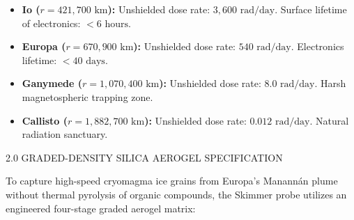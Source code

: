 \documentclass[12pt,twoside,openright]{book}
\newcommand{\sceneheader}[1]{%
  \par\vspace{1.8em}%
  {\noindent\centering\scshape\large #1\par}%
  \vspace{1.0em}%
  \noindent%
}
\newcommand{\dinkus}{%
  \par\vspace{1.2em}%
  {\noindent\centering{\large $\ast\quad\ast\quad\ast$}\par}%
  \vspace{1.2em}%
  \noindent%
}
\providecommand{\tightlist}{\setlength{\itemsep}{0pt}\setlength{\parskip}{0pt}
\setlength{\tabcolsep}{2pt}}
\begin{document}
\begin{itemize}
\tightlist
\item
  \textbf{Io (\(r = 421,700\text{ km}\)):} Unshielded dose rate:
  \textbf{\(3,600 \text{ rad/day}\)}. Surface lifetime of electronics:
  \(< 6\text{ hours}\).
\item
  \textbf{Europa (\(r = 670,900\text{ km}\)):} Unshielded dose rate:
  \textbf{\(540 \text{ rad/day}\)}. Electronics lifetime:
  \(< 40\text{ days}\).
\item
  \textbf{Ganymede (\(r = 1,070,400\text{ km}\)):} Unshielded dose rate:
  \textbf{\(8.0 \text{ rad/day}\)}. Harsh magnetospheric trapping zone.
\item
  \textbf{Callisto (\(r = 1,882,700\text{ km}\)):} Unshielded dose rate:
  \textbf{\(0.012 \text{ rad/day}\)}. Natural radiation sanctuary.
\end{itemize}

\dinkus

\sceneheader{2.0 GRADED-DENSITY SILICA AEROGEL
SPECIFICATION}

To capture high-speed cryomagma ice grains from Europa's Manannán plume
without thermal pyrolysis of organic compounds, the Skimmer probe
utilizes an engineered four-stage graded aerogel matrix:
\end{document}
